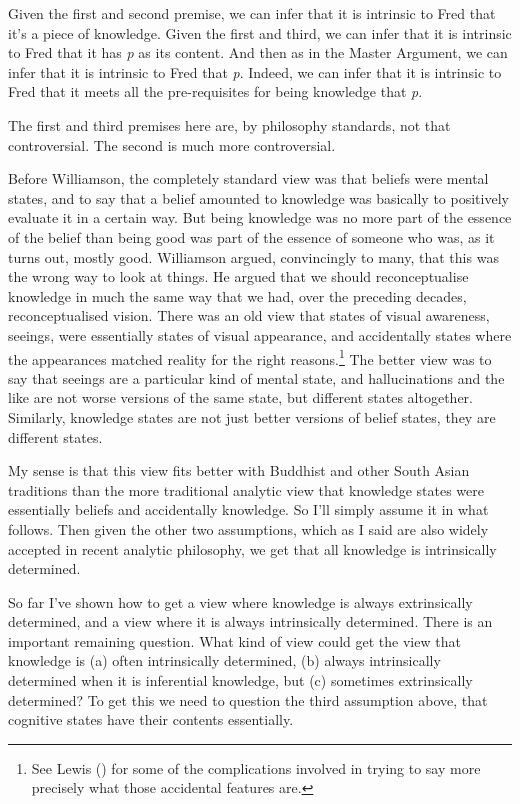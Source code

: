 \documentclass[
  11pt,
  letterpaper,
  DIV=11,
  numbers=noendperiod,
  twoside]{scrartcl}
\begin{document}
Given the first and second premise, we can infer that it is intrinsic to
Fred that it's a piece of knowledge. Given the first and third, we can
infer that it is intrinsic to Fred that it has \emph{p} as its content.
And then as in the Master Argument, we can infer that it is intrinsic to
Fred that \emph{p}. Indeed, we can infer that it is intrinsic to Fred
that it meets all the pre-requisites for being knowledge that \emph{p}.

The first and third premises here are, by philosophy standards, not that
controversial. The second is much more controversial.

Before Williamson, the completely standard view was that beliefs were
mental states, and to say that a belief amounted to knowledge was
basically to positively evaluate it in a certain way. But being
knowledge was no more part of the essence of the belief than being good
was part of the essence of someone who was, as it turns out, mostly
good. Williamson argued, convincingly to many, that this was the wrong
way to look at things. He argued that we should reconceptualise
knowledge in much the same way that we had, over the preceding decades,
reconceptualised vision. There was an old view that states of visual
awareness, seeings, were essentially states of visual appearance, and
accidentally states where the appearances matched reality for the right
reasons.\footnote{See Lewis () for some
  of the complications involved in trying to say more precisely what
  those accidental features are.} The better view was to say that
seeings are a particular kind of mental state, and hallucinations and
the like are not worse versions of the same state, but different states
altogether. Similarly, knowledge states are not just better versions of
belief states, they are different states.

My sense is that this view fits better with Buddhist and other South
Asian traditions than the more traditional analytic view that knowledge
states were essentially beliefs and accidentally knowledge. So I'll
simply assume it in what follows. Then given the other two assumptions,
which as I said are also widely accepted in recent analytic philosophy,
we get that all knowledge is intrinsically determined.

So far I've shown how to get a view where knowledge is always
extrinsically determined, and a view where it is always intrinsically
determined. There is an important remaining question. What kind of view
could get the view that knowledge is (a) often intrinsically determined,
(b) always intrinsically determined when it is inferential knowledge,
but (c) sometimes extrinsically determined? To get this we need to
question the third assumption above, that cognitive states have their
contents essentially.
\end{document}
